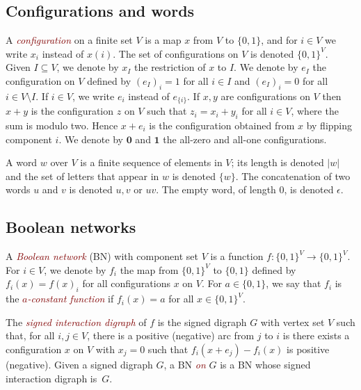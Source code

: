 \documentclass[11pt,letter]{article}
\newcommand{\EM}[1]{{\em\textcolor{Maroon}{#1}}}
\newcommand{\B}{\{0,1\}}
\newcommand{\ONE}{\mathbf{1}}
\newcommand{\ZERO}{{\mathbf{0}}}
\begin{document}
\subsection{Configurations and words}

A \EM{configuration} on a finite set $V$ is a map $x$ from $V$ to $\{0,1\}$, and for $i\in V$ we write $x_i$ instead of $x(i)$. The set of configurations on $V$ is denoted $\B^V$. Given $I\subseteq V$, we denote by $x_I$ the restriction of $x$ to $I$. We denote by $e_I$ the configuration on $V$ defined by $(e_I)_i=1$ for all $i\in I$ and $(e_I)_i=0$ for all $i\in V\setminus I$. If $i\in V$, we write $e_i$ instead of $e_{\{i\}}$. If $x,y$ are configurations on $V$ then $x+y$ is the configuration $z$ on $V$ such that $z_i=x_i+y_i$ for all $i\in V$, where the sum is modulo two. Hence $x+e_i$ is the configuration obtained from $x$ by flipping component $i$. We denote by $\ZERO$ and $\ONE$ the all-zero and all-one configurations. 

\medskip
A word $w$ over $V$ is a finite sequence of elements in $V$; its length is denoted $|w|$ and the set of letters that appear in $w$ is denoted $\{w\}$. The concatenation of two words $u$ and $v$ is denoted $u,v$ or $uv$. The empty word, of length $0$, is denoted $\epsilon$.  

\subsection{Boolean networks} 

A \EM{Boolean network} (BN) with component set $V$ is a function $f:\B^V\to\B^V$. For $i\in V$, we denote by $f_i$ the map from $\B^V$ to $\B$ defined by $f_i(x)=f(x)_i$ for all configurations $x$ on $V$. For $a\in\B$, we say that $f_i$ is the \EM{$a$-constant function} if $f_i(x)=a$ for all $x\in\B^V$. 

\medskip
The \EM{signed interaction digraph} of $f$ is the signed digraph $G$ with vertex set $V$ such that, for all $i,j\in V$, there is a positive (negative) arc from $j$ to $i$ is there exists a configuration $x$ on $V$ with $x_j=0$ such that $f_i(x+e_j)-f_i(x)$ is positive (negative). Given a signed digraph $G$, a BN \EM{on} $G$ is a BN whose signed interaction digraph is~$G$. 
\end{document}
